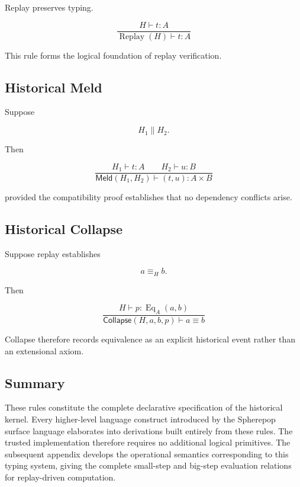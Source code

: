 \documentclass[12pt,oneside]{article}
\theoremstyle{definition}
\theoremstyle{remark}
\newcommand{\Collapse}{\mathsf{Collapse}}
\newcommand{\Meld}{\mathsf{Meld}}
\DeclareMathOperator{\Replay}{Replay}
\begin{document}
Replay preserves typing.

\[
\frac{
H
\vdash
t
:
A
}{
\Replay(H)
\vdash
t
:
A
}
\]

This rule forms the logical foundation of replay verification.


\subsection{Historical Meld}

Suppose

\[
H_1
\parallel
H_2.
\]

Then

\[
\frac{
H_1
\vdash
t
:
A
\qquad
H_2
\vdash
u
:
B
}{
\Meld(H_1,H_2)
\vdash
(t,u)
:
A\times B
}
\]

provided the compatibility proof establishes that no dependency conflicts arise.


\subsection{Historical Collapse}

Suppose replay establishes

\[
a
\equiv_H
b.
\]

Then

\[
\frac{
H
\vdash
p
:
\operatorname{Eq}_A(a,b)
}{
\Collapse(H,a,b,p)
\vdash
a
\equiv
b
}
\]

Collapse therefore records equivalence as an explicit historical event rather
than an extensional axiom.


\subsection{Summary}

These rules constitute the complete declarative specification of the historical
kernel. Every higher-level language construct introduced by the Spherepop
surface language elaborates into derivations built entirely from these rules.
The trusted implementation therefore requires no additional logical primitives.
The subsequent appendix develops the operational semantics corresponding to this
typing system, giving the complete small-step and big-step evaluation relations
for replay-driven computation.
\end{document}
